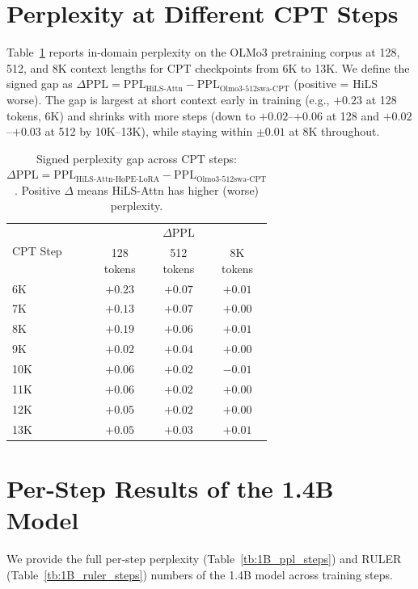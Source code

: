 \section{Perplexity at Different CPT Steps}\label{apdx:ppl_in_cpt}
Table~\ref{tab:ppl_in_cpt} reports in-domain perplexity on the OLMo3 pretraining corpus at 128, 512, and 8K context lengths for CPT checkpoints from 6K to 13K.
We define the signed gap as $\Delta\mathrm{PPL}=\mathrm{PPL}_{\mathrm{HiLS\text{-}Attn}}-\mathrm{PPL}_{\mathrm{Olmo3\text{-}512swa\text{-}CPT}}$ (positive = HiLS worse).
The gap is largest at short context early in training (e.g., $+0.23$ at 128 tokens, 6K) and shrinks with more steps (down to $+0.02$--$+0.06$ at 128 and $+0.02$--$+0.03$ at 512 by 10K--13K), while staying within $\pm 0.01$ at 8K throughout.

\begin{table}[h!]
    \centering
    \small
    \setlength{\tabcolsep}{14pt}
    \renewcommand{\arraystretch}{1.15}
    \begin{tabular}{lccc}
    \toprule
    \multirow{2}{*}{CPT Step}
    & \multicolumn{3}{c}{$\Delta\mathrm{PPL}$}
    \\
    \cmidrule(lr){2-4}
    & \makecell{128\\tokens}
    & \makecell{512\\tokens}
    & \makecell{8K\\tokens}
    \\
    \midrule
    6K  & $+0.23$ & $+0.07$ & $+0.01$ \\
    7K  & $+0.13$ & $+0.07$ & $+0.00$ \\
    8K  & $+0.19$ & $+0.06$ & $+0.01$ \\
    9K  & $+0.02$ & $+0.04$ & $+0.00$ \\
    10K & $+0.06$ & $+0.02$ & $-0.01$ \\
    11K & $+0.06$ & $+0.02$ & $+0.00$ \\
    12K & $+0.05$ & $+0.02$ & $+0.00$ \\
    13K & $+0.05$ & $+0.03$ & $+0.01$ \\
    \bottomrule
    \end{tabular}
    \caption{Signed perplexity gap across CPT steps:
    $\Delta\mathrm{PPL}=\mathrm{PPL}_{\mathrm{HiLS\text{-}Attn\text{-}HoPE\text{-}LoRA}}-\mathrm{PPL}_{\mathrm{Olmo3\text{-}512swa\text{-}CPT}}$.
    Positive $\Delta$ means HiLS-Attn has higher (worse) perplexity.}
    \label{tab:ppl_in_cpt}
\end{table}

\section{Per-Step Results of the 1.4B Model}\label{apdx:1B_perstep}
We provide the full per-step perplexity (Table~\ref{tb:1B_ppl_steps}) and RULER
(Table~\ref{tb:1B_ruler_steps}) numbers of the 1.4B model across training steps.


